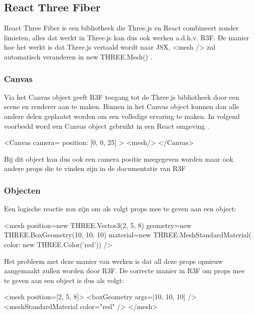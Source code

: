 \subsection{React Three Fiber}

React Three Fiber is een bibliotheek die Three.js en React combineert zonder limieten, alles dat werkt in Three.js kan dus ook werken a.d.h.v. R3F. De manier hoe het werkt is dat Three.js vertaald wordt naar JSX, <mesh /> zal automatisch veranderen in new THREE.Mesh() \autocite{reactThreeFiber2023}.

\subsubsection{Canvas}

Via het Canvas object geeft R3F toegang tot de Three.js bibliotheek door een scene en renderer aan te maken. Binnen in het Canvas object kunnen dan alle andere delen geplaatst worden om een volledige ervaring te maken. In volgend voorbeeld word een Canvas object gebruikt in een React omgeving \autocite{reactThreeFiber2023}.

\begin{LVerbatim}
<Canvas camera={{ position: [0, 0, 25] }} >
	<mesh/>
</Canvas>
\end{LVerbatim}

Bij dit object kan dus ook een camera positie meegegeven worden maar ook andere props die te vinden zijn in de documentatie van R3F

\subsubsection{Objecten}

Een logische reactie zou zijn om als volgt props mee te geven aan een object:

\begin{LVerbatim}
<mesh
	position={new THREE.Vector3(2, 5, 8)}
	geometry={new THREE.BoxGeometry(10, 10, 10)}
	material={new THREE.MeshStandardMaterial({ color: new THREE.Color('red')})}
/>
\end{LVerbatim}

Het probleem met deze manier van werken is dat all deze props opnieuw aangemaakt zullen worden door R3F. De correcte manier in R3F om props mee te geven aan een object is dus als volgt:

\begin{LVerbatim}
<mesh position={[2, 5, 8]}>
	<boxGeometry args={[10, 10, 10]} />
	<meshStandardMaterial color="red" />
</mesh>
\end{LVerbatim}

